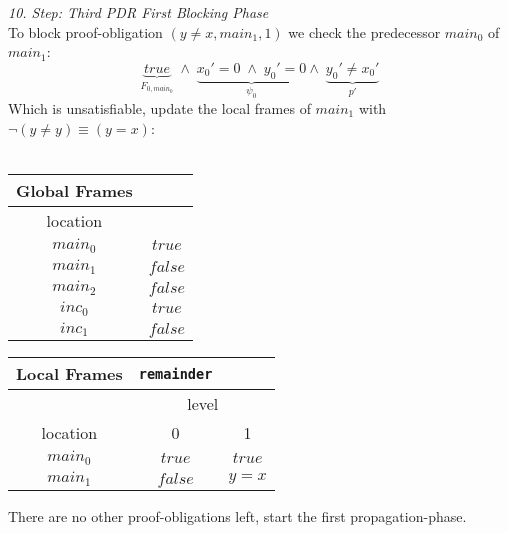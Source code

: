 \documentclass{article}
\begin{document}
	\textsl{10. Step: Third PDR First Blocking Phase} \\
		To block proof-obligation $(y \neq x, main_1, 1)$ we check the predecessor $main_0$ of $main_1$: \\
	\begin{equation*}
	\underbrace{true}_{F_{0, main_0}}\; \land \; \underbrace{x_0' = 0 \; \land \; y_0' = 0}_{\psi_0} \land \; \underbrace{y_0' \neq x_0'}_{p'}
	\end{equation*}
	Which is unsatisfiable, update the local frames of $main_1$ with $\neg(y \neq y) \equiv (y = x)$: \\ \\ 
	\begin{minipage}{.5\textwidth}
		\setlength\tabcolsep{0.35em}
		\begin{center}
			\begin{tabu}{cc}
				Global Frames \\
				\toprule
				location & \\
				$main_0$ & $true$ \\
				$main_1$ & $false$ \\
				$main_2$ & $false$ \\
				$inc_0$ & $true$ \\
				$inc_1$ & $false$\\
				\bottomrule
			\end{tabu}
		\end{center}
	\end{minipage}
	\hfill
	\begin{minipage}{.4\textwidth}
		\setlength\tabcolsep{0.35em}
		\begin{center}
			\begin{tabu}{ccc}
				Local Frames & \texttt{remainder}\\
				\toprule
				& \multicolumn{2}{c}{level} \\
				\cmidrule(lr){2-3}
				location & 0 & 1\\
				\cmidrule{1-3}
				$main_0$ & $true$ & $true$ \\
				$main_1$ & $false$ & $y = x$\\
				\bottomrule
			\end{tabu}
		\end{center}	
	\end{minipage}
	
	\vspace*{2em}
	
	There are no other proof-obligations left, start the first propagation-phase. \\ \\
	
\end{document}
